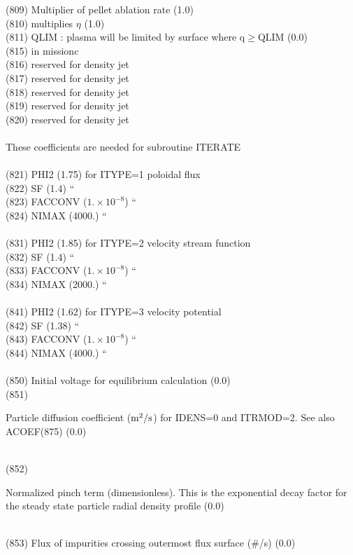 \begin{tabbing}
(809)  \> Multiplier of pellet ablation rate (1.0)\\
(810)  \> multiplies $\eta$ (1.0)\\
(811)  \> QLIM : plasma will be limited by surface where q$\geq$QLIM (0.0)\\
(815) \> in missionc \\
(816) \> reserved for density jet \\
(817) \> reserved for density jet \\
(818) \> reserved for density jet \\
(819) \> reserved for density jet \\
(820) \> reserved for density jet \\
 \\
These coefficients are needed for subroutine ITERATE \\
 \\
(821) \> PHI2 (1.75) for \> ITYPE=1 \> poloidal flux \\
(822) \> SF (1.4)        \> `` \\
(823) \> FACCONV ($1.\times10^{-8}$) \> ``\\
(824) \> NIMAX (4000.) \> ``\\
 \\
(831) \> PHI2 (1.85) for \> ITYPE=2 \> velocity stream function\\
(832) \> SF (1.4) \> ``\\
(833) \> FACCONV ($1.\times10^{-8}$) \> `` \\
(834) \> NIMAX (2000.) \> ``\\
 \\
(841) \> PHI2 (1.62) for \> ITYPE=3 \> velocity potential\\
(842) \> SF (1.38) \> ``\\
(843) \> FACCONV ($1.\times10^{-8}$) \> `` \\
(844) \> NIMAX (4000.) \> ``\\
 \\
(850) \> Initial voltage for equilibrium calculation (0.0)\\
(851) \> \parbox[t]{\width}{Particle diffusion coefficient ($\rm m^2/s$) 
for IDENS=0 and ITRMOD=2.  See also ACOEF(875) (0.0)}\\
(852) \> \parbox[t]{\width}{Normalized pinch term (dimensionless).  This is the 
exponential decay factor for the steady state particle radial density profile (0.0)}\\
(853) \> Flux of impurities crossing outermost flux surface (\#/s) (0.0)\\

\end{tabbing}

